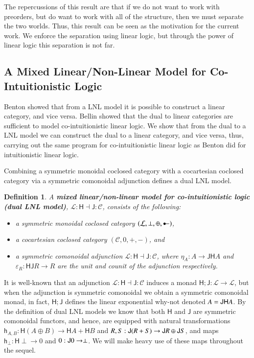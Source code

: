 \documentclass{lmcs}
\newtheorem{definition}[theorem]{Definition}
\let\mto\to
\let\to\relax
\newcommand{\to}{\rightarrow}
\let\j\relax
\let\wn\relax
\newcommand{\cat}[1]{\mathcal{#1}}
\newcommand{\func}[1]{\mathsf{#1}}
\newcommand{\colimp}[0]{\multimapdotinv}
\newcommand{\h}[1]{\mathsf{h}_{#1}}
\newcommand{\j}[1]{\mathsf{j}_{#1}}
\newcommand{\wn}[0]{\mathop{?}}
\begin{document}
The repercussions of this result are that if we do not want to work
with preorders, but do want to work with all of the structure, then we
must separate the two worlds.  Thus, this result can be seen as the
motivation for the current work.  We enforce the separation using
linear logic, but through the power of linear logic this separation is
not far.


\subsection{A Mixed Linear/Non-Linear Model for Co-Intuitionistic Logic}
\label{subsec:a_mixed_linear/non-linear_model_for_co-intuitionistic_logic}

Benton \cite{Benton:1994} showed that from a LNL model it is possible
to construct a linear category, and vice versa.  Bellin
\cite{Bellin:2012} showed that the dual to linear categories are
sufficient to model co-intuitionistic linear logic. We show that from
the dual to a LNL model we can construct the dual to a linear
category, and vice versa, thus, carrying out the same program for
co-intuitionistic linear logic as Benton did for intuitionistic linear
logic.

Combining a symmetric monoidal coclosed category with a cocartesian
coclosed category via a symmetric comonoidal adjunction defines a
dual LNL model.
\begin{definition}
  \label{def:dual LNL-model}
  A
  \textbf{mixed linear/non-linear model for co-intuitionistic logic (dual LNL model)},
  $\cat{L} : \func{H} \dashv \func{J} : \cat{C}$, consists of the following:
  \begin{itemize}
  \item[i.] a symmetric monoidal coclosed category $(\cat{L},\perp,\oplus,\colimp)$,
  \item[ii.] a cocartesian coclosed category $(\cat{C},0,+,-)$, and
  \item[iv.] a symmetric comonoidal adjunction $\cat{L} : \func{H}
    \dashv \func{J} : \cat{C}$, where $\eta_A : A \mto
    \func{JH}A$ and $\varepsilon_R : \func{HJ}R \mto R$
    are the unit and counit of the adjunction respectively.
  \end{itemize}
\end{definition}
It is well-known that an adjunction $\cat{L} : \func{H} \dashv
\func{J} : \cat{C}$ induces a monad $\func{H};\func{J} : \cat{L} \mto
\cat{L}$, but when the adjunction is symmetric comonoidal we obtain a
symmetric comonoidal monad, in fact, $\func{H};\func{J}$ defines the
linear exponential why-not denoted $\wn A = \func{JH}A$.
By the definition of dual LNL models we know that both $\func{H}$ and
$\func{J}$ are symmetric comonoidal functors, and hence, are equipped
with natural transformations $\h{A,B} : \func{H}(A \oplus B) \mto
\func{H}A + \func{H}B$ and $\j{R,S} : \func{J}(R + S) \mto \func{J}R
\oplus \func{J}S$, and maps $\h{\perp} : \func{H}\perp \mto 0$ and
$\j{0} : \func{J}0 \mto \perp$.  We will make heavy use of these
maps throughout the sequel.
\end{document}

